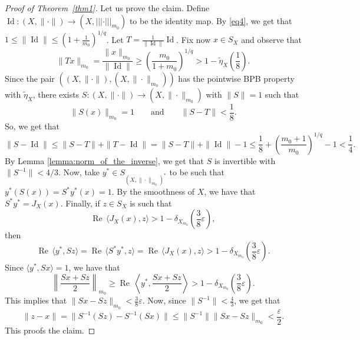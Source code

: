 \documentclass[a4paper,10pt]{amsart}
\theoremstyle{plain}
\theoremstyle{definition}
\DeclareMathOperator{\re}{Re\,}
\DeclareMathOperator{\Id}{\mathrm{Id}}
\newcommand{\ds}{\displaystyle}
\newcommand{\eps}{\varepsilon}
\renewcommand{\geq}{\geqslant}
\renewcommand{\leq}{\leqslant}
\begin{document}
\begin{proof}[Proof of Theorem~\ref{thm1}]
Let us prove the claim. Define $\Id: (X, \| \cdot \|) \longrightarrow (X, ||| \cdot |||_{m_0})$ to be the identity map. By \eqref{eq4}, we get that $1 \leq \|\Id\| \leq \left(1 + \frac{1}{m_0} \right)^{1/q}$. Let $T=\frac{1}{\|\Id\|}\Id$. Fix now $x\in S_X$ and observe that
\begin{equation*}
\|Tx\|_{m_0} = \frac{\|x\|_{m_0}}{\|\Id\|} \geq \left(\frac{m_0}{1 + m_0}\right)^{1/q} > 1 - \tilde\eta_X \left(\frac{1}{8}\right).	
\end{equation*}
Since the pair $((X, \| \cdot \|), (X,\| \cdot \|_{m_0}))$ has the pointwise BPB property with  $\tilde\eta_X$, there exists $S: (X, \| \cdot \|) \longrightarrow (X, \|\cdot\|_{m_0})$ with $\|S\| = 1$ such that
\begin{equation*}
\|S(x)\|_{m_0} = 1 \qquad \text{and} \qquad \|S - T\| < \frac{1}{8}.	
\end{equation*}
So, we get that
\begin{equation*}
\|S - \Id\| \leq \|S - T\| + \|T - \Id\| = \|S - T\| + \|\Id\| - 1 \leq \frac{1}{8} +  \left(\frac{m_0+1}{m_0}\right)^{1/q} - 1  < \frac{1}{4}.
\end{equation*}
By Lemma \ref{lemma:norm_of_the_inverse}, we get that $S$ is invertible with $\|S^{-1}\|<4/3$. Now, take $y^* \in S_{(X, \|\cdot\|_{m_0})^*}$ to be such that $y^*(S(x)) = S^*y^*(x) = 1$. By the smoothness of $X$, we have that $S^*y^* = J_X(x)$. Finally, if $z \in S_X$ is such that
\begin{equation*}
\re \langle J_X(x), z \rangle > 1 - \delta_{X_{m_0}} \left( \frac{3}{8} \eps \right),	
\end{equation*}
then
\begin{equation*}
\re \langle y^*, Sz \rangle = \re \langle S^* y^*, z \rangle = \re \langle J_X(x), z \rangle > 1 - \delta_{X_{m_0}} \left( \frac{3}{8} \eps \right).	
\end{equation*}
Since $\langle y^*, Sx\rangle = 1$, we have that
\begin{equation*}
\left\| \frac{Sx + Sz}{2} \right\|_{m_0} \geq \re \left \langle y^*, \frac{Sx + Sz}{2} \right \rangle > 1 - \delta_{X_{m_0}} \left( \frac{3}{8} \eps \right).
\end{equation*}
This implies that $\ds \|Sx - Sz\|_{m_0} < \frac{3}{8} \eps$. Now, since $\ds \|S^{-1}\| < \frac{4}{3}$, we get that
\begin{equation*}\|z - x\| = \|S^{-1}(Sz) - S^{-1}(Sx)\| \leq \|S^{-1}\| \|Sx - Sz\|_{m_0} < \frac{\eps}{2}.
\end{equation*}
This proofs the claim.
\end{proof}
\end{document}
